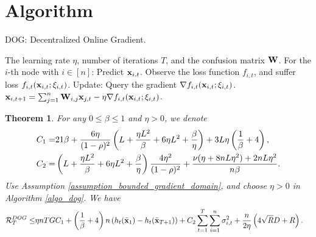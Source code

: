\documentclass{article}
\newtheorem{Theorem}{\bf{Theorem}}
\begin{document}
\section{Algorithm}


\newcommand\StateX{\Statex\hspace{\algorithmicindent}}
\begin{algorithm}[!]
   \caption{DOG: Decentralized Online Gradient.}
   \label{algo_dog}
   \begin{algorithmic}[1]
   \Require The learning rate $\eta$, number of iterations $T$, and the confusion matrix ${\bf W}$.
           \StateX For the $i$-th node with $i\in[n]$:
            \State \indent Predict ${\bf x}_{i,t}$.
            \State \indent Observe the loss function $f_{i,t}$,
            \StateX \indent and suffer loss $f_{i,t}({\bf x}_{i,t};\xi_{i,t})$.
            \StateX Update:
            \State \indent Query the gradient $\nabla f_{i,t}({\bf x}_{i,t};\xi_{i,t})$.  
            \State \indent ${\bf x}_{i,t+1} = \sum_{j=1}^n {\bf W}_{i,j}{\bf x}_{j,t} - \eta \nabla f_{i,t}({\bf x}_{i,t};\xi_{i,t})$. 
       \EndFor
   \end{algorithmic}
\end{algorithm}





\begin{Theorem}
\label{theorem_regret_upper_bound}
For any $0\le \beta \le 1$ and $\eta>0$, we denote 
\begin{align}
\nonumber
C_1 = & 21\beta + \frac{6\eta}{(1-\rho)^2}\left(  L + \frac{\eta L^2}{\beta} + 6\eta L^2 + \frac{\beta}{\eta}  \right) + 3L\eta\left( \frac{1}{\beta} + 4 \right), \\ \nonumber
C_2 = & \left(  L + \frac{\eta L^2}{\beta}  + 6\eta L^2  + \frac{\beta}{\eta}  \right) \frac{4\eta^2}{(1-\rho)^2} + \frac{\nu(\eta + 8nL\eta^2) + 2nL\eta^2}{n\beta}.
\end{align} Use Assumption \ref{assumption_bounded_gradient_domain}, and choose $\eta>0$ in Algorithm \ref{algo_dog}.  We have
\begin{align}
\nonumber
{\mathcal{R}}_T^{DOG}\le & \eta nTG C_1 + \left( \frac{1}{\beta}+4 \right)n \left( h_t(\bar{{\bf x}}_1) - h_t(\bar{{\bf x}}_{T+1}) \right)  + C_2 \sum_{t=1}^T\sum_{i=1}^n \sigma_{i,t}^2 + \frac{n}{2\eta}\left(  4\sqrt{R}D + R   \right).
\end{align} 


\end{Theorem}
\end{document}
